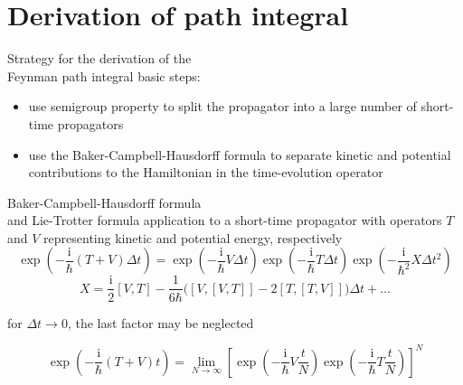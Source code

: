 \documentclass[t,dvipsnames]{beamer}
\begin{document}
\section{Derivation of path integral}

\begin{frame}[c]{}
 \begin{center}
  \begin{minipage}{0.8\textwidth}
   \tableofcontents[currentsection]
  \end{minipage}
 \end{center}
\end{frame}

\begin{frame}[c]{Strategy for the derivation of the\\
	         Feynman path integral}
 basic steps:
 \begin{itemize}
  \item use semigroup property to split the propagator into
	a large number of short-time propagators
  \item use the Baker-Campbell-Hausdorff formula to separate
	kinetic and potential contributions to the Hamiltonian
        in the time-evolution operator
 \end{itemize}
\end{frame}

\begin{frame}[c]{Baker-Campbell-Hausdorff formula\\
	         and Lie-Trotter formula}
 application to a short-time propagator with operators $T$ and
 $V$ representing kinetic and potential energy, respectively
 \begin{displaymath}
   \exp\!\left(-\frac{\text{i}}{\hbar}(T+V)\Delta t\right)
	  = \exp\!\left(-\frac{\text{i}}{\hbar}V\Delta t\right)
	     \exp\!\left(-\frac{\text{i}}{\hbar}T\Delta t\right)
	     \exp\!\left(-\frac{\text{i}}{\hbar^2}X\Delta t^2\right)
 \end{displaymath}
 \begin{displaymath}
  X = \frac{\text{i}}{2}[V,T]
      -\frac{1}{6\hbar}\bigg([V,[V,T]]-2[T,[T,V]]\bigg)\Delta t+\ldots
 \end{displaymath}

 \vspace{0.3truecm}
 for $\Delta t\to 0$, the last factor may be neglected

 \begin{displaymath}
  \exp\!\left(-\frac{\text{i}}{\hbar}(T+V)t\right) =
    \lim_{N\to\infty}\left[\exp\!\left(-\frac{\text{i}}{\hbar}V\frac{t}{N}\right)
      \exp\!\left(-\frac{\text{i}}{\hbar}T\frac{t}{N}\right)\right]^N
 \end{displaymath}
\end{frame}
\end{document}
